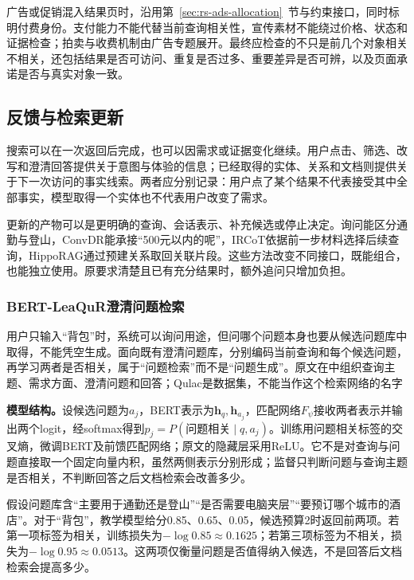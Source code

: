 广告或促销混入结果页时，沿用第~\ref{sec:rs-ads-allocation}~节与约束接口，同时标明付费身份。支付能力不能代替当前查询相关性，宣传素材不能绕过价格、状态和证据检查；拍卖与收费机制由广告专题展开。最终应检查的不只是前几个对象相关不相关，还包括结果是否可访问、重复是否过多、重要差异是否可辨，以及页面承诺是否与真实对象一致。

\subsection{反馈与检索更新}
\label{sec:rs-search-feedback}

搜索可以在一次返回后完成，也可以因需求或证据变化继续。用户点击、筛选、改写和澄清回答提供关于意图与体验的信息；已经取得的实体、关系和文档则提供关于下一次访问的事实线索。两者应分别记录：用户点了某个结果不代表接受其中全部事实，模型取得一个实体也不代表用户改变了需求。

更新的产物可以是更明确的查询、会话表示、补充候选或停止决定。询问能区分通勤与登山，ConvDR能承接“500元以内的呢”，IRCoT依据前一步材料选择后续查询，HippoRAG通过预建关系取回关联片段。这些方法改变不同接口，既能组合，也能独立使用。原要求清楚且已有充分结果时，额外追问只增加负担。

\Needspace{100mm}
\subsubsection{BERT-LeaQuR澄清问题检索}
\label{sec:rs-search-leaqur}

用户只输入“背包”时，系统可以询问用途，但问哪个问题本身也要从候选问题库中取得，不能凭空生成。面向既有澄清问题库，分别编码当前查询和每个候选问题，再学习两者是否相关，属于“问题检索”而不是“问题生成”。原文在中组织查询主题、需求方面、澄清问题和回答；Qulac是数据集，不能当作这个检索网络的名字

\textbf{模型结构。}设候选问题为$a_j$，BERT表示为$\bm h_q,\bm h_{a_j}$，匹配网络$F_\psi$接收两者表示并输出两个logit，经softmax得到$p_j=P(\text{问题相关}\mid q,a_j)$。训练用问题相关标签的交叉熵，微调BERT及前馈匹配网络；原文的隐藏层采用ReLU。它不是对查询与问题直接取一个固定向量内积，虽然两侧表示分别形成；监督只判断问题与查询主题是否相关，不判断回答之后文档检索会改善多少。

假设问题库含“主要用于通勤还是登山”“是否需要电脑夹层”“要预订哪个城市的酒店”。对于“背包”，教学模型给分0.85、0.65、0.05，候选预算2时返回前两项。若第一项标签为相关，训练损失为$-\log0.85\approx0.1625$；若第三项标签为不相关，损失为$-\log0.95\approx0.0513$。这两项仅衡量问题是否值得纳入候选，不是回答后文档检索会提高多少。

